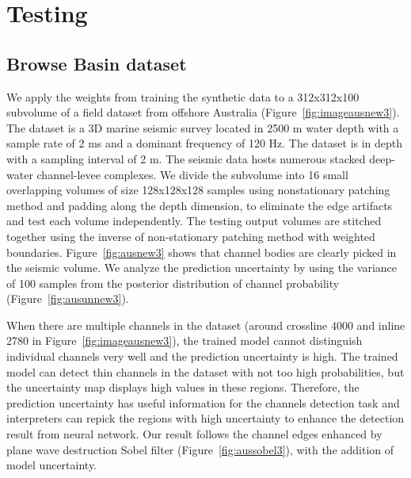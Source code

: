 \section{Testing}
\subsection{Browse Basin dataset}
We apply the weights from training the synthetic data to a 312x312x100 subvolume of a field dataset from offshore Australia (Figure~\ref{fig:imageausnew3}). The dataset is a 3D marine seismic survey located in 2500 m water depth with a sample rate of 2 ms and a dominant frequency of 120 Hz. The dataset is in depth with a sampling interval of 2 m. The seismic data hosts numerous stacked deep-water channel-levee complexes. We divide the subvolume into 16 small overlapping volumes of size 128x128x128 samples using nonstationary patching method \cite[]{geoest} and padding along the depth dimension, to eliminate the edge artifacts and test each volume independently. The testing output volumes are stitched together using the inverse of non-stationary patching method with weighted boundaries. Figure~\ref{fig:ausnew3} shows that channel bodies are clearly picked in the seismic volume. We analyze the prediction uncertainty by using the variance of 100 samples from the posterior distribution of channel probability (Figure~\ref{fig:ausunnew3}).

When there are multiple channels in the dataset (around crossline 4000 and inline 2780 in Figure~\ref{fig:imageausnew3}), the trained model cannot distinguish individual channels very well and the prediction uncertainty is high. The trained model can detect thin channels in the dataset with not too high probabilities, but the uncertainty map displays high values in these regions. Therefore, the prediction uncertainty has useful information for the channels detection task and interpreters can repick the regions with high uncertainty to enhance the detection result from neural network. Our result follows the channel edges enhanced by plane wave destruction Sobel filter \cite[]{Mason} (Figure~\ref{fig:aussobel3}), with the addition of model uncertainty. 


